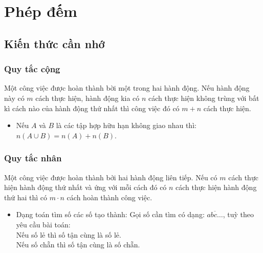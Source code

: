 \section{Phép đếm}
\subsection{Kiến thức cần nhớ}
\begin{khung}
	\subsubsection{Quy tắc cộng} Một công việc được hoàn thành bời một trong hai hành động. Nếu hành động này có $m$ cách thực hiện, hành động kia có $n$ cách thực hiện không trùng với bất kì cách nào của hành động thứ nhất thì công việc đó có $m + n$ cách thực hiện.
	\begin{itemize}
		\item Nếu $A$ và $B$ là các tập hợp hữu hạn không giao nhau thì: $n(A\cup B)=n(A)+n(B)$.
	\end{itemize}
	\subsubsection{Quy tắc nhân} Một công việc được hoàn thành bởi hai hành động liên tiếp. Nếu có $m$ cách thực hiện hành động thứ nhất và ứng với mỗi cách đó có $n$ cách thực hiện hành động thứ hai thì có $m\cdot n$ cách hoàn thành công việc.
	\begin{itemize}
		\item Dạng toán tìm số các số tạo thành: Gọi số cần tìm có dạng: $\overline{abc\ldots}$, tuỳ theo yêu cầu bài toán:\\
		Nếu số lẻ thì số tận cùng là số lẻ.\\
		Nếu số chẵn thì số tận cùng là số chẵn.
	\end{itemize}
\end{khung}

